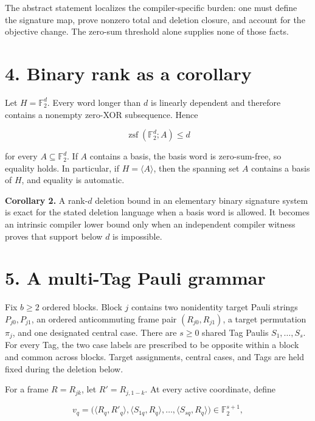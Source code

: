 \documentclass[
  11pt,
]{article}
\begin{document}
The abstract statement localizes the compiler-specific burden: one must
define the signature map, prove nonzero total and deletion closure, and
account for the objective change. The zero-sum threshold alone supplies
none of those facts.

\hypertarget{binary-rank-as-a-corollary}{%
\section{4. Binary rank as a
corollary}\label{binary-rank-as-a-corollary}}

Let \(H=\mathbb F_2^d\). Every word longer than \(d\) is linearly
dependent and therefore contains a nonempty zero-XOR subsequence. Hence

\[
\operatorname{zsf}(\mathbb F_2^d; A)\le d
\]

for every \(A\subseteq\mathbb F_2^d\). If \(A\) contains a basis, the
basis word is zero-sum-free, so equality holds. In particular, if
\(H=\langle A\rangle\), then the spanning set \(A\) contains a basis of
\(H\), and equality is automatic.

\textbf{Corollary 2.} A rank-\(d\) deletion bound in an elementary
binary signature system is exact for the stated deletion language when a
basis word is allowed. It becomes an intrinsic compiler lower bound only
when an independent compiler witness proves that support below \(d\) is
impossible.

\hypertarget{a-multi-tag-pauli-grammar}{%
\section{5. A multi-Tag Pauli grammar}\label{a-multi-tag-pauli-grammar}}

Fix \(b\ge2\) ordered blocks. Block \(j\) contains two nonidentity
target Pauli strings \(P_{j0},P_{j1}\), an ordered anticommuting frame
pair \((R_{j0},R_{j1})\), a target permutation \(\pi_j\), and one
designated central case. There are \(s\ge0\) shared Tag Paulis
\(S_1,\ldots,S_s\). For every Tag, the two case labels are prescribed to
be opposite within a block and common across blocks. Target assignments,
central cases, and Tags are held fixed during the deletion below.

For a frame \(R=R_{jk}\), let \(R'=R_{j,1-k}\). At every active
coordinate, define

\[
v_q=\bigl(\langle R_q, R'_q\rangle,
\langle S_{1q}, R_q\rangle, \ldots,
\langle S_{sq}, R_q\rangle\bigr)
\in\mathbb F_2^{s+1},
\]
\end{document}
